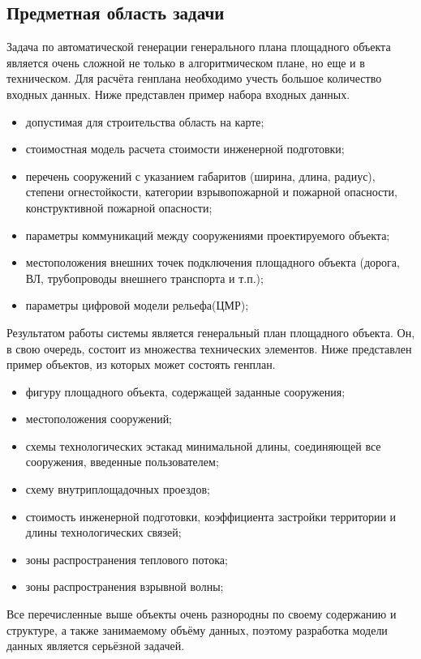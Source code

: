 \subsection{\Large{Предметная область задачи}}

Задача по автоматической генерации генерального плана площадного объекта является очень сложной не только
в алгоритмическом плане, но еще и в техническом. Для расчёта генплана необходимо учесть большое количество входных
данных.
Ниже представлен пример набора входных данных.
\begin{itemize}
    \item допустимая для строительства область на карте;
    \item стоимостная модель расчета стоимости инженерной подготовки;
    \item перечень сооружений с указанием габаритов (ширина, длина, радиус),
    степени огнестойкости, категории взрывопожарной и пожарной опасности, конструктивной пожарной опасности;
    \item параметры коммуникаций между сооружениями проектируемого объекта;
    \item местоположения внешних точек подключения площадного объекта (дорога, ВЛ, трубопроводы внешнего транспорта и т.п.);
    \item параметры цифровой модели рельефа(ЦМР);
\end{itemize}

Результатом работы системы является генеральный план площадного объекта.
Он, в свою очередь, состоит из множества технических элементов.
Ниже представлен пример объектов, из которых может состоять генплан.
\begin{itemize}
    \item фигуру площадного объекта, содержащей заданные сооружения;
    \item местоположения сооружений;
    \item схемы технологических эстакад минимальной длины, соединяющей все сооружения, введенные пользователем;
    \item схему внутриплощадочных проездов;
    \item стоимость инженерной подготовки, коэффициента застройки территории и длины технологических связей;
    \item зоны распространения теплового потока;
    \item зоны распространения взрывной волны;
\end{itemize}

Все перечисленные выше объекты очень разнородны по своему содержанию и структуре, а также занимаемому объёму данных,
поэтому разработка модели данных является серьёзной задачей.